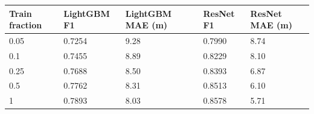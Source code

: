 \begin{tabular}{lllll}
\toprule
Train fraction & LightGBM F1 & LightGBM MAE (m) & ResNet F1 & ResNet MAE (m) \\
\midrule
0.05 & 0.7254 & 9.28 & 0.7990 & 8.74 \\
0.1 & 0.7455 & 8.89 & 0.8229 & 8.10 \\
0.25 & 0.7688 & 8.50 & 0.8393 & 6.87 \\
0.5 & 0.7762 & 8.31 & 0.8513 & 6.10 \\
1 & 0.7893 & 8.03 & 0.8578 & 5.71 \\
\bottomrule
\end{tabular}
